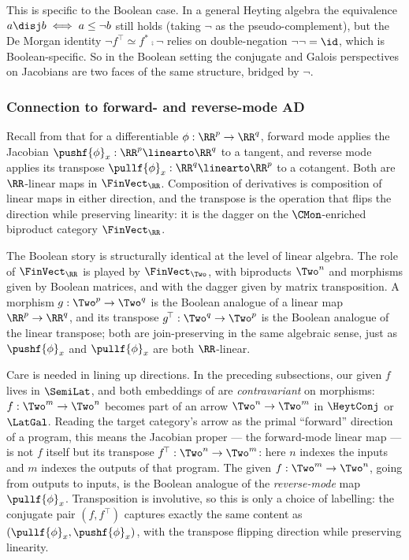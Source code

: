 This is specific to the Boolean case. In a general Heyting algebra the equivalence $a \disj b \iff a \le
\neg b$ still holds (taking $\neg$ as the pseudo-complement), but the De Morgan identity $\neg f^{\!\top}
\simeq f^* \comp \neg$ relies on double-negation $\neg\neg = \id$, which is Boolean-specific. So in the
Boolean setting the conjugate and Galois perspectives on Jacobians are two faces of the same structure,
bridged by $\neg$.

\subsubsection{Connection to forward- and reverse-mode AD}
\label{sec:boolean-jacobians:ad}

Recall from  that for a differentiable $\phi: \RR^p \to \RR^q$, forward mode applies the
Jacobian $\pushf{\phi}_x: \RR^p \linearto \RR^q$ to a tangent, and reverse mode applies its transpose
$\pullf{\phi}_x: \RR^q \linearto \RR^p$ to a cotangent. Both are $\RR$-linear maps in $\FinVect_\RR$.
Composition of derivatives is composition of linear maps in either direction, and the transpose is the
operation that flips the direction while preserving linearity: it is the dagger on the $\CMon$-enriched
biproduct category $\FinVect_\RR$.

The Boolean story is structurally identical at the level of linear algebra. The role of $\FinVect_\RR$ is
played by $\FinVect_\Two$, with biproducts $\Two^n$ and morphisms given by Boolean
matrices, and with the dagger given by matrix transposition. A morphism $g: \Two^p \to \Two^q$ is the
Boolean analogue of a linear map $\RR^p \to \RR^q$, and its transpose $g^{\!\top}: \Two^q \to \Two^p$ is the
Boolean analogue of the linear transpose; both are join-preserving in the same algebraic sense, just as
$\pushf{\phi}_x$ and $\pullf{\phi}_x$ are both $\RR$-linear.

Care is needed in lining up directions. In the preceding subsections, our given $f$ lives in
$\SemiLat$, and both embeddings of  are \emph{contravariant} on
morphisms: $f: \Two^m \to \Two^n$ becomes part of an arrow $\Two^n \to \Two^m$ in $\HeytConj$ or $\LatGal$.
Reading the target category's arrow as the primal ``forward'' direction of a program, this means the
Jacobian proper --- the forward-mode linear map --- is not $f$ itself but its transpose
$f^{\!\top}: \Two^n \to \Two^m$: here $n$ indexes the inputs and $m$ indexes the outputs of that program. The given $f: \Two^m \to \Two^n$, going from outputs to inputs, is
the Boolean analogue of the \emph{reverse-mode} map $\pullf{\phi}_x$. Transposition is involutive, so this
is only a choice of labelling: the conjugate pair $(f, f^{\!\top})$ captures exactly the same content as
$(\pullf{\phi}_x, \pushf{\phi}_x)$, with the transpose flipping direction while preserving linearity.

